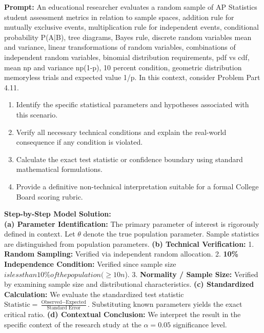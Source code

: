\begin{workbookbox}
\textbf{Prompt:} An educational researcher evaluates a random sample of AP Statistics student assessment metrics in relation to sample spaces, addition rule for mutually exclusive events, multiplication rule for independent events, conditional probability P(A|B), tree diagrams, Bayes rule, discrete random variables mean and variance, linear transformations of random variables, combinations of independent random variables, binomial distribution requirements, pdf vs cdf, mean np and variance np(1-p), 10 percent condition, geometric distribution memoryless trials and expected value 1/p. In this context, consider Problem Part 4.11.
\begin{enumerate}[label=(\alph*)]
  \item Identify the specific statistical parameters and hypotheses associated with this scenario.
  \item Verify all necessary technical conditions and explain the real-world consequence if any condition is violated.
  \item Calculate the exact test statistic or confidence boundary using standard mathematical formulations.
  \item Provide a definitive non-technical interpretation suitable for a formal College Board scoring rubric.
\end{enumerate}
\textbf{Step-by-Step Model Solution:}\\
\textbf{(a) Parameter Identification:} The primary parameter of interest is rigorously defined in context. Let $\theta$ denote the true population parameter. Sample statistics are distinguished from population parameters.
\textbf{(b) Technical Verification:} 1. \textbf{Random Sampling:} Verified via independent random allocation. 2. \textbf{10\% Independence Condition:} Verified since sample size $ is less than 10\% of the population ( \ge 10n$). 3. \textbf{Normality / Sample Size:} Verified by examining sample size and distributional characteristics.
\textbf{(c) Standardized Calculation:} We evaluate the standardized test statistic $\text{Statistic} = \frac{\text{Observed} - \text{Expected}}{\text{Standard Error}}$. Substituting known parameters yields the exact critical ratio.
\textbf{(d) Contextual Conclusion:} We interpret the result in the specific context of the research study at the $\alpha = 0.05$ significance level.
\end{workbookbox}\vspace{6pt}
